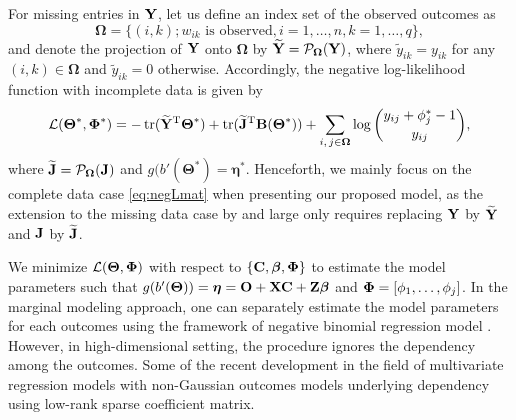 \documentclass[12pt]{article}
\def\trans{^{\rm T}}
\newcommand{\bbL}{\mathcal{L}}
\newcommand{\bs}{\boldsymbol}
\newcommand{\cb}{\color{blue}}
\DeclareMathOperator{\Tr}{tr}
\begin{document}
For missing entries in ${\bf Y}$, let us define an index set of the observed outcomes as
$$
\bs\Omega = \{(i,k); w_{ik} \mbox{ is observed}, i=1,\ldots,n, k=1,\ldots,q\},
$$
and denote the projection of ${\bf Y}$ onto $\bs\Omega$ by $\widetilde{\Y}= \mathcal{P}_{\bs\Omega}(\Y)$, where $\tilde{y}_{ik} = y_{ik}$ for any $(i,k)\in\bs\Omega$ and  $\tilde{y}_{ik}=0$ otherwise. 
Accordingly, the negative log-likelihood function with incomplete data is given by 
\begin{align*}
\bbL(\bs\Theta^*,\bPhi^* )  = - \Tr( \widetilde{\Y}\trans\bs\Theta^*  ) + \Tr( \widetilde{\J}\trans\bB(\bs\Theta^*) ) + \sum_{i,\,j \in \bs\Omega} \log {y_{ij} + \phi_j^* -1 \choose y_{ij}}, 
\end{align*}
where $\widetilde{\J} = \mathcal{P}_{\bs\Omega}(\J)$ and $g(b'(\bs\Theta^*) = \bs\eta^*$. 
Henceforth, we mainly focus on the complete data case \eqref{eq:negLmat} when presenting our proposed model, as the extension to the missing data case by and large only requires replacing ${\bf Y}$ by $\widetilde{{\bf Y}}$ and ${\bf J}$ by $\widetilde{{\bf J}}$.





{\cb We minimize $\bbL(\bs\Theta,\bPhi )$ with respect to $\{{\bf C}, \mbox{\boldmath $\beta$}, \mbox{\boldmath $\Phi$}\}$ to estimate the model parameters such that  $g(b'(\bs\Theta)) = \bs\eta =  \bO + \X\C + \Z\bbeta$ and $\mbox{\boldmath $\Phi$} = [\phi_1,\ldots,\phi_j]$. In the marginal modeling approach, one can separately  estimate the model parameters for each outcomes using the framework of negative binomial regression model \citet{zeileis2008regression}. However, in high-dimensional setting,  the procedure ignores the dependency among the outcomes. Some of the recent development in the field of multivariate  regression models with non-Gaussian outcomes  models underlying dependency using low-rank sparse coefficient matrix.  
}
\end{document}
